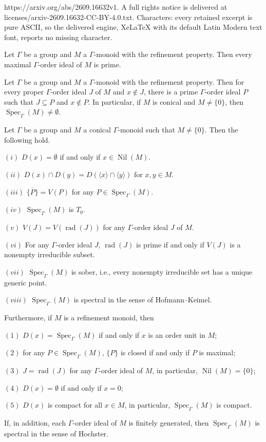 \documentclass[10pt,a4paper]{amsart}
\newcommand{\Spec}{\operatorname{Spec}}
\newcommand{\nil}{\operatorname{Nil}}
\newcommand{\rad}{\operatorname{rad}}
\begin{document}
https://arxiv.org/abs/2609.16632v1. A full rights notice is delivered at licenses/arxiv-2609.16632-CC-BY-4.0.txt. Characters: every retained excerpt is pure ASCII, so the delivered engine, XeLaTeX with its default Latin Modern text font, reports no missing character.
\begin{lem}\label{lem maximal order ideal is prime}
Let $\Gamma$ be a group and $M$ a $\Gamma$-monoid with the refinement property. Then every maximal $\Gamma$-order ideal of $M$ is prime.    
\end{lem}

\begin{lem}\label{lem proper ideal contained in a prime ideal}
Let $\Gamma$ be a group and $M$ a $\Gamma$-monoid with the refinement property. Then for every proper $\Gamma$-order ideal $J$ of $M$ and $x\notin J$, there is a prime $\Gamma$-order ideal $P$ such that $J\subseteq P$ and $x\notin P$. In particular, if $M$ is conical and $M\neq \{0\}$, then $\Spec_\Gamma(M)\neq \emptyset$.    
\end{lem}

\begin{prop}\label{pro basic facts about basic open sets}
Let $\Gamma$ be a group and $M$ a conical $\Gamma$-monoid such that $M\neq \{0\}$. Then the following hold.

$(i)$ $D(x)=\emptyset$ if and only if $x\in \nil(M)$.

$(ii)$ $D(x)\cap D(y)=D(\langle x\rangle \cap \langle y\rangle)$ for $x,y\in M$.

$(iii)$ $\overline{\{P\}}=V(P)$ for any $P\in \Spec_\Gamma(M)$.

$(iv)$ $\Spec_\Gamma(M)$ is $T_0$.

$(v)$ $V(J)=V(\rad(J))$ for any $\Gamma$-order ideal $J$ of $M$.

$(vi)$ For any $\Gamma$-order ideal $J$, $\rad(J)$ is prime if and only if $V(J)$ is a nonempty irreducible subset.

$(vii)$ $\Spec_\Gamma(M)$ is sober, i.e., every nonempty irreducible set has a unique generic point.

$(viii)$ $\Spec_\Gamma(M)$ is spectral in the sense of Hofmann--Keimel.

Furthermore, if $M$ is a refinement monoid, then 

$(1)$ $D(x)=\Spec_\Gamma(M)$ if and only if $x$ is an order unit in $M$;

$(2)$ for any $P\in \Spec_\Gamma(M)$, $\{P\}$ is closed if and only if $P$ is maximal;

$(3)$ $J=\rad(J)$ for any $\Gamma$-order ideal of $M$, in particular, $\nil(M)=\{0\}$;

$(4)$ $D(x)=\emptyset$ if and only if $x=0$;

$(5)$ $D(x)$ is compact for all $x\in M$, in particular, $\Spec_\Gamma(M)$ is compact. 

If, in addition, each $\Gamma$-order ideal of $M$ is finitely generated, then $\Spec_\Gamma(M)$ is spectral in the sense of Hochster. 
\end{prop}
\end{document}
